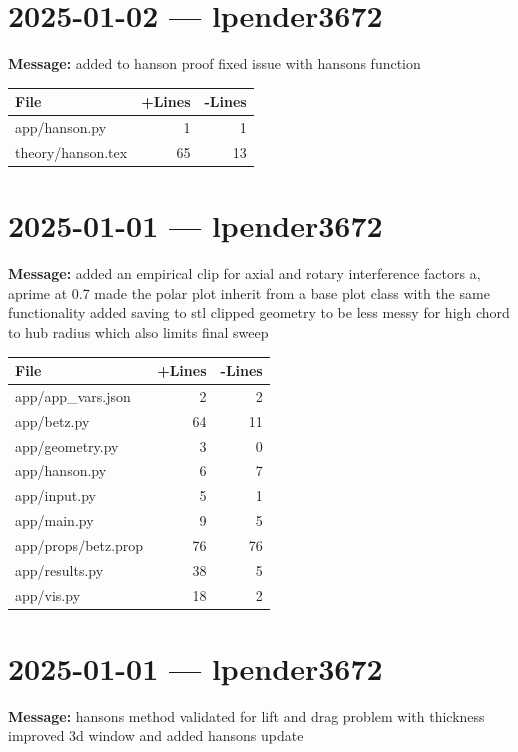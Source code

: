 \documentclass{article}
\begin{document}
\section*{2025-01-02 --- lpender3672}
\textbf{Message:} added to hanson proof fixed issue with hansons function

\begin{longtable}{|p{10cm}|r|r|}
\hline \textbf{File} & \textbf{+Lines} & \textbf{-Lines} \\
\hline
app/hanson.py & 1 & 1 \\
\hline
theory/hanson.tex & 65 & 13 \\
\hline
\end{longtable}

\section*{2025-01-01 --- lpender3672}
\textbf{Message:} added an empirical clip for axial and rotary interference factors a, aprime at 0.7 made the polar plot inherit from a base plot class with the same functionality added saving to stl clipped geometry to be less messy for high chord to hub radius which also limits final sweep

\begin{longtable}{|p{10cm}|r|r|}
\hline \textbf{File} & \textbf{+Lines} & \textbf{-Lines} \\
\hline
app/app\_vars.json & 2 & 2 \\
\hline
app/betz.py & 64 & 11 \\
\hline
app/geometry.py & 3 & 0 \\
\hline
app/hanson.py & 6 & 7 \\
\hline
app/input.py & 5 & 1 \\
\hline
app/main.py & 9 & 5 \\
\hline
app/props/betz.prop & 76 & 76 \\
\hline
app/results.py & 38 & 5 \\
\hline
app/vis.py & 18 & 2 \\
\hline
\end{longtable}

\section*{2025-01-01 --- lpender3672}
\textbf{Message:} hansons method validated for lift and drag problem with thickness improved 3d window and added hansons update
\end{document}
